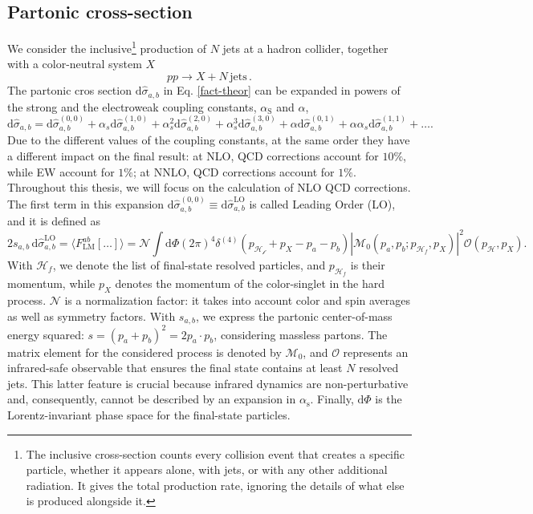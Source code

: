 \documentclass[a4paper, 12pt]{book}
\begin{document}
\subsection{Partonic cross-section}
We consider the inclusive\footnote{The inclusive cross-section counts every collision event that creates a specific particle, whether it appears alone, with jets, or with any other additional radiation. It gives the total production rate, ignoring the details of what else is produced alongside it.} production of $N$ jets at a hadron collider, together with a color-neutral system $X$
\begin{equation}
    pp \rightarrow X + N \, \mathrm{jets}  \, .
\end{equation}
The partonic cros section $\mathrm{d}\hat{\sigma}_{a,b}$ in Eq. \ref{fact-theor} can be expanded in powers of the strong and the electroweak coupling constants, $\alpha_{\text{S}}$ and $\alpha$,
\begin{equation}
    \text{d} \hat{\sigma}_{a,b} = \text{d} \hat{\sigma}_{a,b}^{(0,0)} + \alpha_s \text{d} \hat{\sigma}_{a,b}^{(1,0)} + \alpha_s^2 \text{d} \hat{\sigma}_{a,b}^{(2,0)} + \alpha_s^3 \text{d} \hat{\sigma}_{a,b}^{(3,0)} + \alpha \text{d} \hat{\sigma}_{a,b}^{(0,1)} + \alpha \alpha_s \text{d} \hat{\sigma}_{a,b}^{(1,1)} + \dots .
\end{equation}
Due to the different values of the coupling constants, at the same order they have a different impact on the final result: at NLO, QCD corrections account for $10\%$, while EW account for $1\%$; at NNLO, QCD corrections account for $1\%$. Throughout this thesis, we will focus on the calculation of NLO QCD corrections. \\
The first term in this expansion $\text{d} \hat{\sigma}_{a,b}^{(0,0)} \equiv \text{d} \hat{\sigma}_{a,b}^{\text{LO}}$ is called Leading Order (LO), and it is defined as \cite{Devoto:2025jql}
\begin{equation}
    2s_{a,b} \, \text{d} \hat{\sigma}_{a,b}^{\text{LO}} = \langle F^{ab}_{\mathrm{LM}}[\dots] \rangle = \mathcal{N} \int \mathrm{d}\Phi (2\pi)^4 \delta^{(4)}(p_\mathcal{H_f}+p_X-p_a-p_b) \left|\mathcal{M}_0(p_a,p_b;p_{\mathcal{H}_f},p_X) \right|^2 \mathcal{O}(p_\mathcal{H},p_X).
    \label{leading-order}
\end{equation}
With $\mathcal{H}_f$, we denote the list of final-state resolved particles, and $p_{\mathcal{H}_f}$ is their momentum, while $p_X$ denotes the momentum of the color-singlet in the hard process. $\mathcal{N}$ is a normalization factor: it takes into account color and spin averages as well as symmetry factors. With $s_{a,b}$, we express the partonic center-of-mass energy squared: $s=(p_a+p_b)^2=2 p_a\cdot p_b$, considering massless partons. The matrix element for the considered process is denoted by $\mathcal{M}_0$, and $\mathcal{O}$ represents an infrared-safe observable that ensures the final state contains at least $N$ resolved jets. This latter feature is crucial because infrared dynamics are non-perturbative and, consequently, cannot be described by an expansion in $\alpha_\mathrm{s}$. Finally, $\mathrm{d}\Phi$ is the Lorentz-invariant phase space for the final-state particles.
\end{document}
